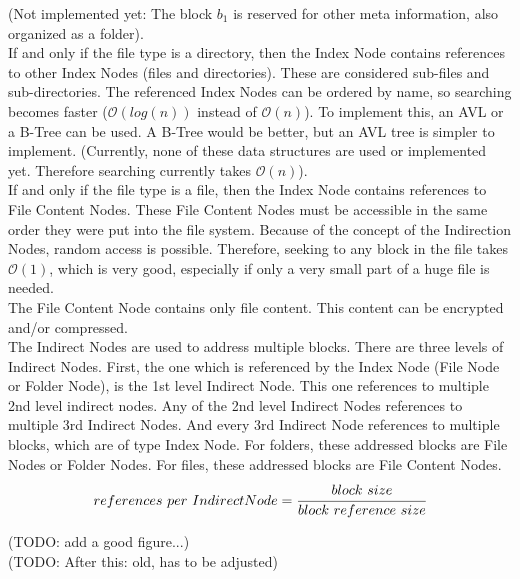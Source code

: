 \documentclass[a4paper,12pt]{article}
\begin{document}
(Not implemented yet: The block $b_{1}$ is reserved for other meta information, also organized as a folder).\\

If and only if the file type is a directory, then the Index Node contains references to other Index Nodes (files and directories). These are considered sub-files and sub-directories. The referenced Index Nodes can be ordered by name, so searching becomes faster ($\mathcal{O}(log(n))$ instead of $\mathcal{O}(n)$). To implement this, an AVL or a B-Tree can be used. A B-Tree would be better, but an AVL tree is simpler to implement. (Currently, none of these data structures are used or implemented yet. Therefore searching currently takes $\mathcal{O}(n)$).\\

If and only if the file type is a file, then the Index Node contains references to File Content Nodes. These File Content Nodes must be accessible in the same order they were put into the file system. Because of the concept of the Indirection Nodes, random access is possible. Therefore, seeking to any block in the file takes $\mathcal{O}(1)$, which is very good, especially if only a very small part of a huge file is needed.\\

The File Content Node contains only file content. This content can be encrypted and/or compressed.\\

The Indirect Nodes are used to address multiple blocks. There are three levels of Indirect Nodes. First, the one which is referenced by the Index Node (File Node or Folder Node), is the 1st level Indirect Node. This one references to multiple 2nd level indirect nodes. Any of the 2nd level Indirect Nodes references to multiple 3rd Indirect Nodes. And every 3rd Indirect Node references to multiple blocks, which are of type Index Node. For folders, these addressed blocks are File Nodes or Folder Nodes. For files, these addressed blocks are File Content Nodes.\\

$$references\ per\ Indirect Node = \cfrac{block\ size}{block\ reference\ size}$$



(TODO: add a good figure...)\\

(TODO: After this: old, has to be adjusted)\\
\\
\end{document}
